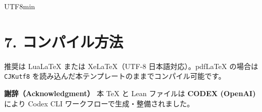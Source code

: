 \documentclass[luatexja,ja=standard,a4paper,12pt]{bxjsarticle}
\begin{document}
\begin{CJK}{UTF8}{min}
\section*{7. コンパイル方法}
推奨は LuaLaTeX または XeLaTeX（UTF-8 日本語対応）。pdfLaTeX の場合は \verb|CJKutf8| を読み込んだ本テンプレートのままでコンパイル可能です。

\bigskip
\noindent\textbf{謝辞（Acknowledgment）}\; 本 TeX と Lean ファイルは \textbf{CODEX (OpenAI)} により Codex CLI ワークフローで生成・整備されました。

\end{CJK}
\end{document}
